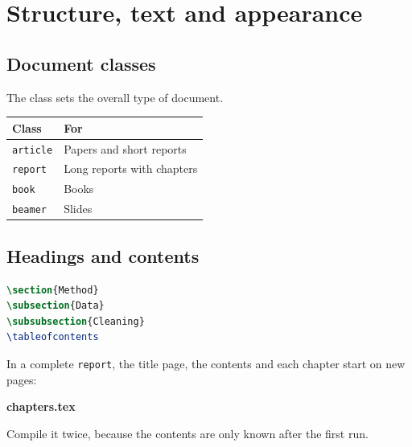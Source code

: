 \chapter{Structure, text and appearance}
\label{ch:text}

\section{Document classes}\label{document-classes}

The class sets the overall type of document.

{\def\LTcaptype{none} %
\begin{longtable}[]{@{}ll@{}}
\toprule\noalign{}
Class & For \\
\midrule\noalign{}
\endhead
\bottomrule\noalign{}
\endlastfoot
\texttt{article} & Papers and short reports \\
\texttt{report} & Long reports with chapters \\
\texttt{book} & Books \\
\texttt{beamer} & Slides \\
\end{longtable}
}

\section{Headings and contents}\label{headings-and-contents}

\begin{lstlisting}[language=latex]
\section{Method}
\subsection{Data}
\subsubsection{Cleaning}
\tableofcontents
\end{lstlisting}

In a complete \texttt{report}, the title page, the contents and each chapter start on new pages:

\textbf{chapters.tex}



Compile it twice, because the contents are only known after the first run.

